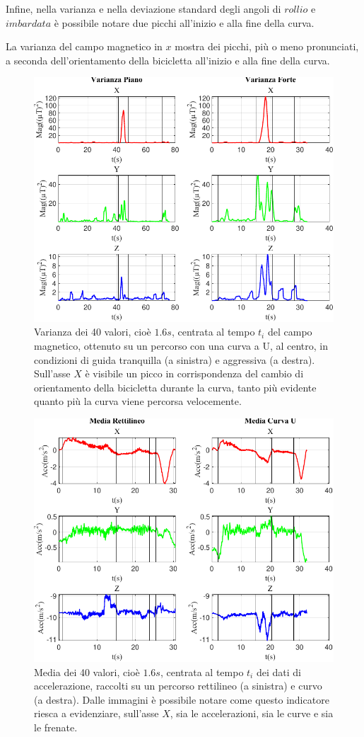 \documentclass[class=article]{standalone}
\begin{document}
	Infine, nella varianza e nella deviazione standard degli angoli di \(rollio\) e \(imbardata\) è possibile notare due picchi all'inizio e alla fine della curva.\hfill\break
	
	La varianza del campo magnetico in \(x\) mostra dei picchi, più o meno pronunciati, a seconda dell'orientamento della bicicletta all'inizio e alla fine della curva.
	
	\begin{center}
		\begin{figure}[h!]
			\centering\includegraphics[width=.7\textwidth]{img/curvaUFP/Mag/Varianza}
			\caption[]{Varianza dei 40 valori, cioè \(1.6s\), centrata al tempo \(t_{i}\) del campo magnetico, ottenuto su un percorso con una curva a U, al centro, in condizioni di guida tranquilla (a sinistra) e aggressiva (a destra). Sull'asse \(X\) è visibile un picco in corrispondenza del cambio di orientamento della bicicletta durante la curva, tanto più evidente quanto più la curva viene percorsa velocemente.}
			\label{fig:MagVar_curvaUFP}
		\end{figure}
	\end{center}
	
	\begin{center}
		\begin{figure}[h!]
			\centering\includegraphics[width=.7\textwidth]{img/LungaCurvaU/Acc/Media}
			\caption[]{Media dei 40 valori, cioè \(1.6s\), centrata al tempo \(t_{i}\) dei dati di accelerazione, raccolti su un percorso rettilineo (a sinistra) e curvo (a destra). Dalle immagini è possibile notare come questo indicatore riesca a evidenziare, sull'asse \(X\), sia le accelerazioni, sia le curve e sia le frenate.}
			\label{fig:AccMedia_LungaCurvaU}
		\end{figure}
	\end{center}
	
\end{document}
